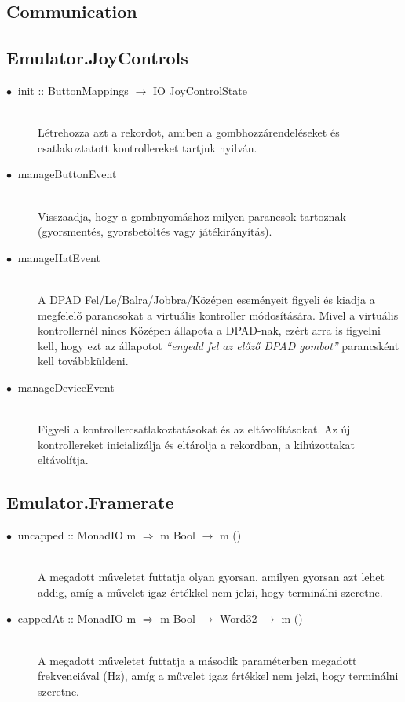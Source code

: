\subsection{Communication}

\subsection{Emulator.JoyControls}

\begin{description}
	\item[$\bullet\:$ init :: ButtonMappings $\rightarrow$ IO JoyControlState] \hfill \\
	Létrehozza azt a rekordot, amiben a gombhozzárendeléseket és csatlakoztatott kontrollereket tartjuk nyilván.
	\item[$\bullet\:$ manageButtonEvent] \hfill \\
	Visszaadja, hogy a gombnyomáshoz milyen parancsok tartoznak (gyorsmentés, gyorsbetöltés vagy játékirányítás). 
	\item[$\bullet\:$ manageHatEvent] \hfill \\
	A DPAD Fel/Le/Balra/Jobbra/Középen eseményeit figyeli és kiadja a megfelelő parancsokat a virtuális kontroller módosítására. Mivel a virtuális kontrollernél nincs Középen állapota a DPAD-nak, ezért arra is figyelni kell, hogy ezt az állapotot \emph{``engedd fel az előző DPAD gombot''} parancsként kell továbbküldeni.
	\item[$\bullet\:$ manageDeviceEvent] \hfill \\
	Figyeli a kontrollercsatlakoztatásokat és az eltávolításokat.
	Az új kontrollereket inicializálja és eltárolja a rekordban, a kihúzottakat eltávolítja.
\end{description}

\subsection{Emulator.Framerate}

\begin{description}
	\item[$\bullet\:$ uncapped :: MonadIO m $\Rightarrow$ m Bool $\rightarrow$ m ()] \hfill \\
	A megadott műveletet futtatja olyan gyorsan, amilyen gyorsan azt lehet addig, amíg a művelet igaz értékkel nem jelzi, hogy terminálni szeretne.
	\item[$\bullet\:$ cappedAt :: MonadIO m $\Rightarrow$ m Bool $\rightarrow$ Word32 $\rightarrow$ m ()] \hfill \\
	A megadott műveletet futtatja a második paraméterben megadott frekvenciával (Hz), amíg a művelet igaz értékkel nem jelzi, hogy terminálni szeretne.
\end{description}


